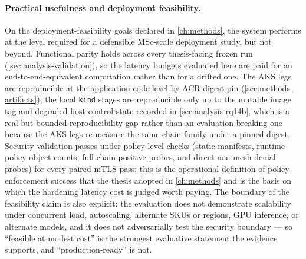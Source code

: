 \paragraph{Practical usefulness and deployment feasibility.}
On the deployment-feasibility goals declared in \cref{ch:methods},
the system performs at the level required for a defensible MSc-scale
deployment study, but not beyond. Functional parity holds across
every thesis-facing frozen run
(\cref{sec:analysis-validation}), so the latency budgets evaluated
here are paid for an end-to-end-equivalent computation rather than
for a drifted one. The AKS legs are reproducible at the
application-code level by ACR digest pin
(\cref{sec:methods-artifacts}); the local
\texttt{kind} stages are reproducible only up to the mutable image
tag and degraded host-control state recorded in
\cref{sec:analysis-rq14b}, which is a real but bounded reproducibility
gap rather than an evaluation-breaking one because the AKS legs
re-measure the same chain family under a pinned digest. Security
validation passes under policy-level checks (static manifests,
runtime policy object counts, full-chain positive probes, and direct
non-mesh denial probes) for every paired mTLS pass; this is the
operational definition of policy-enforcement success that the thesis adopted
in \cref{ch:methods} and is the basis on which the
hardening latency cost is judged worth paying. The boundary of the
feasibility claim is also explicit: the evaluation does not
demonstrate scalability under concurrent load, autoscaling, alternate
SKUs or regions, GPU inference, or alternate models, and it does not
adversarially test the security boundary --- so ``feasible at modest
cost'' is the strongest evaluative statement the evidence supports,
and ``production-ready'' is not.

